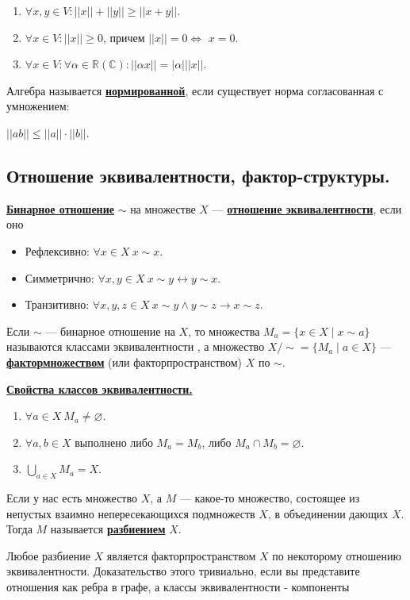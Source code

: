 \documentclass[twoside]{book}
\newcommand{\deff}[1]{\underline{\textbf{#1}}}
\newcommand{\thmm}[1]{\underline{\textbf{#1}}}
\begin{document}
\begin{enumerate}
    \item $\forall x, y \in V : ||x|| + ||y||\geq ||x+y||$.
    \item $\forall x \in V : ||x||\geq 0$, причем $||x||=0 \Leftrightarrow$ $x = 0$.
    \item $\forall x \in V : \forall \alpha \in \mathbb{R}(\mathbb{C}) : ||\alpha x|| = |\alpha|||x||$.
\end{enumerate}

Алгебра называется \deff{нормированной}, если существует норма согласованная с умножением:

$||ab||\leq ||a|| \cdot ||b||$.

\subsection{Отношение эквивалентности, фактор-структуры.}



\deff{Бинарное отношение} $\sim$ на множестве $X$ --- \deff{отношение эквивалентности}, если оно
\begin{itemize}
    \item Рефлексивно: $\forall x\in X~x\sim x$.
    \item Симметрично: $\forall x,y\in X~x\sim y\leftrightarrow y\sim x$.
    \item Транзитивно: $\forall x,y,z\in X~x\sim y\land y\sim z\rightarrow x\sim z$.
\end{itemize}
Если $\sim$ --- бинарное отношение на $X$, то множества $M_a=\{x\in X\mid x\sim a\}$ называются классами эквивалентности , а множество $X/\sim=\{M_a\mid a\in X\}$ --- \deff{фактормножеством} (или {факторпространством}) $X$ по $\sim$.

\thmm{Свойства классов эквивалентности.}
\begin{enumerate}
    \item $\forall a\in X~M_a\neq\varnothing$.
    \item $\forall a,b\in X$ выполнено либо $M_a=M_b$, либо $M_a\cap M_b=\varnothing$.
    \item $\bigcup\limits_{a\in X}M_a=X$.
\end{enumerate}

Если у нас есть множество $X$, а $M$ --- какое-то множество, состоящее из непустых взаимно непересекающихся подмножеств $X$, в объединении дающих $X$. Тогда $M$ называется \deff{разбиением} $X$.


Любое разбиение $X$ является факторпространством $X$ по некоторому отношению эквивалентности. Доказательство этого тривиально, если вы представите отношения как ребра в графе, а классы эквивалентности - компоненты
\end{document}
